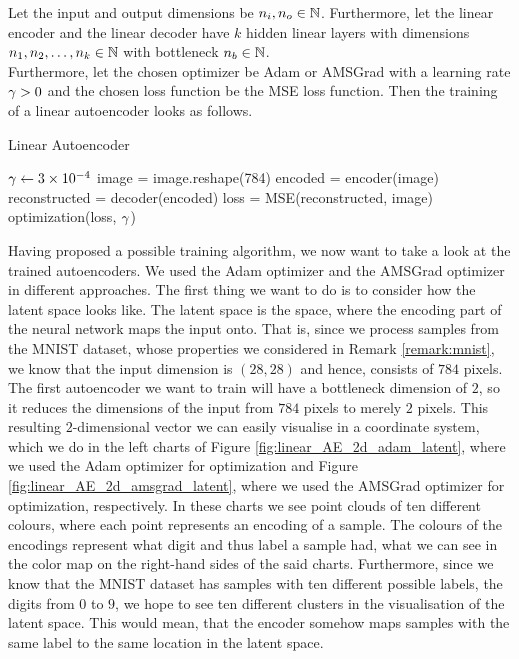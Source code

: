 \begin{algorithm}
Let the input and output dimensions be $n_i, n_o \in\operatorname{\mathbb{N}}$. Furthermore, let the linear encoder and the linear decoder have $k$ hidden linear layers with dimensions $n_1, n_2,\ldots, n_k\in\operatorname{\mathbb{N}}$ with bottleneck $n_b\in\operatorname{\mathbb{N}}$.\\
Furthermore, let the chosen optimizer be Adam or AMSGrad with a learning rate $\operatorname{\gamma}>0$ and the chosen loss function be the MSE loss function. Then the training of a linear autoencoder looks as follows.
\caption{Linear Autoencoder}\label{alg:linear_AE}
\begin{algorithmic}[1]
\Require $\operatorname{\gamma} \gets \num{3e-4}$ 
		\State image = image.reshape(784) 
	    \State encoded = encoder(image) 
		\State reconstructed = decoder(encoded) 
    	\State loss = MSE(reconstructed, image) 
	    \State optimization(loss, $\operatorname{\gamma}$) 
    \EndFor
\EndFor
\end{algorithmic}
\end{algorithm}


Having proposed a possible training algorithm, we now want to take a look at the trained autoencoders. We used the Adam optimizer and the AMSGrad optimizer in different approaches. The first thing we want to do is to consider how the latent space looks like. The latent space is the space, where the encoding part of the neural network maps the input onto. That is, since we process samples from the MNIST dataset, whose properties we considered in Remark \ref{remark:mnist}, we know that the input dimension is $(28, 28)$ and hence, consists of $784$ pixels. The first autoencoder we want to train will have a bottleneck dimension of $2$, so it reduces the dimensions of the input from $784$ pixels to merely $2$ pixels. This resulting $2$-dimensional vector we can easily visualise in a coordinate system, which we do in the left charts of Figure \ref{fig:linear_AE_2d_adam_latent}, where we used the Adam optimizer for optimization and Figure \ref{fig:linear_AE_2d_amsgrad_latent}, where we used the AMSGrad optimizer for optimization, respectively. In these charts we see point clouds of ten different colours, where each point represents an encoding of a sample. The colours of the encodings represent what digit and thus label a sample had, what we can see in the color map on the right-hand sides of the said charts. Furthermore, since we know that the MNIST dataset has samples with ten different possible labels, the digits from $0$ to $9$, we hope to see ten different clusters in the visualisation of the latent space. This would mean, that the encoder somehow maps samples with the same label to the same location in the latent space.


